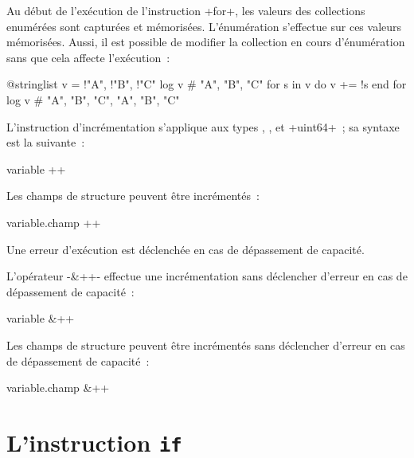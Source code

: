 Au début de l'exécution de l'instruction \ggs+for+, les valeurs des collections enumérées sont capturées et mémorisées. L'énumération s'effectue sur ces valeurs mémorisées. Aussi, il est possible de modifier la collection en cours d'énumération sans que cela affecte l'exécution~:
\begin{galgas}
@stringlist v = {!"A", !"B", !"C"}
log v # "A", "B", "C"
for s in v do
  v += !s
end for
log v # "A", "B", "C", "A", "B", "C"
\end{galgas}





















L'instruction d'incrémentation s'applique aux types  ,  ,  et \ggs+uint64+~; sa syntaxe est la suivante~:

\begin{galgasbox}
variable ++
\end{galgasbox}

Les champs de structure peuvent être incrémentés~:
\begin{galgasbox}
variable.champ ++
\end{galgasbox}

Une erreur d'exécution est déclenchée en cas de dépassement de capacité.

L'opérateur \ggs-&++- effectue une incrémentation sans déclencher d'erreur en cas de dépassement de capacité~:
\begin{galgasbox}
variable &++
\end{galgasbox}

Les champs de structure peuvent être incrémentés sans déclencher d'erreur en cas de dépassement de capacité~:
\begin{galgasbox}
variable.champ &++
\end{galgasbox}








\section{L'instruction \texttt{if}}


